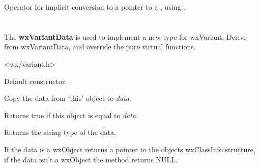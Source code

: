 
Operator for implicit conversion to a pointer to a , using .

\section{}\label{wxvariantdata}

The {\bf wxVariantData} is used to implement a new type for wxVariant. Derive from wxVariantData,
and override the pure virtual functions.




<wx/variant.h>




\label{wxvariantdatactor}


Default constructor.

\label{wxvariantdatacopy}


Copy the data from `this' object to {\it data}.

\label{wxvariantdataeq}


Returns true if this object is equal to {\it data}.

\label{wxvariantdatagettype}


Returns the string type of the data.

\label{wxvariantdatagetvalueclassinfo}


If the data is a wxObject returns a pointer to the objects wxClassInfo structure, if
the data isn't a wxObject the method returns NULL.

